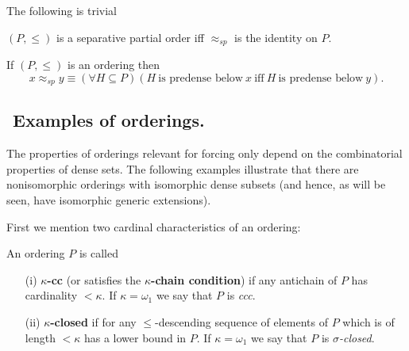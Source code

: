 \medskip

The following is trivial

\begin{fact}
$(P,\leq)$ is a separative partial order iff $\approx_{sp}$ is the identity on $P$.
\end{fact}

\begin{fact}
If $(P,\leq)$ is an ordering then
$$ %
x\approx_{sp}y\equiv(\forall H\subseteq P)(H\ \mbox{is predense below}\ x\ \mbox{iff}\
H\ \mbox{is predense below}\ y).
$$ %
\end{fact}



\subsection{${}$ \hspace{-1em}Examples of orderings.}


The properties of orderings relevant for forcing only depend on the combinatorial properties of dense sets.
The following examples illustrate that there are nonisomorphic orderings with isomorphic dense subsets
(and hence, as will be seen, have isomorphic generic extensions).

First we mention two cardinal characteristics of an ordering:

\begin{definition}
An ordering $P$ is called
 \begin{itemize}
  \item[(i)]{\bf $\kappa$-cc} (or satisfies the {\bf $\kappa$-chain condition}) if any antichain of $P$ has cardinality $<\kappa$. If $\kappa=\omega_1$ we say that $P$ is \emph{ccc}.

  \item[(ii)]{\bf $\kappa$-closed} if for any $\leq$-descending sequence of
	elements of $P$ which is of length $<\kappa$ has a lower bound in $P$.
	If $\kappa=\omega_1$
        we say that $P$ is \emph{$\sigma$-closed}.
 \end{itemize}
\end{definition}

